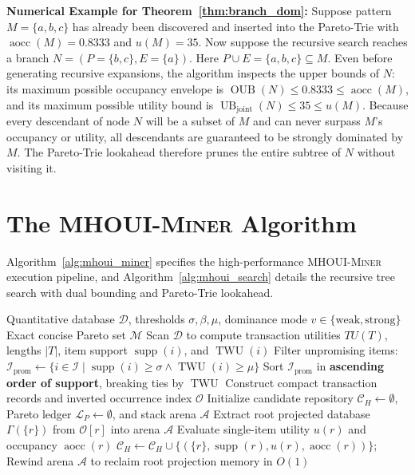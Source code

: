 \documentclass[runningheads]{llncs}
\newcommand{\MHOUIminer}{\textsc{MHOUI-Miner}}
\newcommand{\supp}{\operatorname{supp}}
\newcommand{\aocc}{\operatorname{aocc}}
\newcommand{\twu}{\operatorname{TWU}}
\newcommand{\OUB}{\operatorname{OUB}}
\newcommand{\UBjoint}{\operatorname{UB}_{\mathrm{joint}}}
\begin{document}
\noindent
\textbf{Numerical Example for Theorem~\ref{thm:branch_dom}:}
Suppose pattern $M = \{a, b, c\}$ has already been discovered and inserted into the Pareto-Trie with $\aocc(M) = 0.8333$ and $u(M) = 35$.
Now suppose the recursive search reaches a branch $N = (P=\{b, c\}, E=\{a\})$.
Here $P \cup E = \{a, b, c\} \subseteq M$.
Even before generating recursive expansions, the algorithm inspects the upper bounds of $N$:
its maximum possible occupancy envelope is $\OUB(N) \le 0.8333 \le \aocc(M)$, and its maximum possible utility bound is $\UBjoint(N) \le 35 \le u(M)$.
Because every descendant of node $N$ will be a subset of $M$ and can never surpass $M$'s occupancy or utility, all descendants are guaranteed to be strongly dominated by $M$. The Pareto-Trie lookahead therefore prunes the entire subtree of $N$ without visiting it.

\section{The \MHOUIminer{} Algorithm}
\label{sec:algorithm}

Algorithm~\ref{alg:mhoui_miner} specifies the high-performance \MHOUIminer{} execution pipeline, and Algorithm~\ref{alg:mhoui_search} details the recursive tree search with dual bounding and Pareto-Trie lookahead.

\begin{algorithm}[htbp]
\caption{\textsc{MHOUI-Miner}}
\label{alg:mhoui_miner}
\begin{algorithmic}[1]
\Require Quantitative database $\mathcal{D}$, thresholds $\sigma, \beta, \mu$, dominance mode $v \in \{\text{weak}, \text{strong}\}$
\Ensure Exact concise Pareto set $\mathcal{M}$
\State Scan $\mathcal{D}$ to compute transaction utilities $TU(T)$, lengths $|T|$, item support $\supp(i)$, and $\twu(i)$
\State Filter unpromising items: $\mathcal{I}_{\text{prom}} \gets \{i \in \mathcal{I} \mid \supp(i) \ge \sigma \land \twu(i) \ge \mu\}$
\State Sort $\mathcal{I}_{\text{prom}}$ in \textbf{ascending order of support}, breaking ties by $\twu$
\State Construct compact transaction records and inverted occurrence index $\mathcal{O}$
\State Initialize candidate repository $\mathcal{C}_H \gets \emptyset$, Pareto ledger $\mathcal{L}_P \gets \emptyset$, and stack arena $\mathcal{A}$
    \State Extract root projected database $\Gamma(\{r\})$ from $\mathcal{O}[r]$ into arena $\mathcal{A}$
    \State Evaluate single-item utility $u(r)$ and occupancy $\aocc(r)$
    \If{$u(r) \ge \mu$ \textbf{and} $\aocc(r) \ge \beta$}
        \State $\mathcal{C}_H \gets \mathcal{C}_H \cup \{(\{r\}, \supp(r), u(r), \aocc(r))\}$; \Call{Ledger-Insert}{$\mathcal{L}_P, \{r\}, u(r), \aocc(r)$}
    \EndIf
    \State {}
    \State Rewind arena $\mathcal{A}$ to reclaim root projection memory in $O(1)$
\EndFor
{}
    \State \Return {}
\Else
    \State \Return {}
\EndIf
\end{algorithmic}
\end{algorithm}
\end{document}
